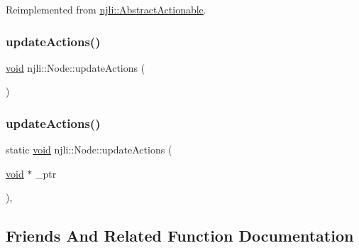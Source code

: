 Reimplemented from \mbox{\hyperlink{classnjli_1_1_abstract_actionable_aab364e6f121a457e33a61850300c2d7b}{njli\+::\+Abstract\+Actionable}}.

\mbox{\label{classnjli_1_1_node_aafd87adc70ed57be9d7f045a1be3412c}} 
\subsubsection{\texorpdfstring{update\+Actions()}{updateActions()}\hspace{0.1cm}{\footnotesize\ttfamily [1/2]}}
{\footnotesize\ttfamily \mbox{\hyperlink{_thread_8h_af1e856da2e658414cb2456cb6f7ebc66}{void}} njli\+::\+Node\+::update\+Actions (\begin{DoxyParamCaption}{ }\end{DoxyParamCaption})\hspace{0.3cm}{\ttfamily [protected]}}

\mbox{\label{classnjli_1_1_node_a4d3f767e870dca336b5daabb1abc00ea}} 
\subsubsection{\texorpdfstring{update\+Actions()}{updateActions()}\hspace{0.1cm}{\footnotesize\ttfamily [2/2]}}
{\footnotesize\ttfamily static \mbox{\hyperlink{_thread_8h_af1e856da2e658414cb2456cb6f7ebc66}{void}} njli\+::\+Node\+::update\+Actions (\begin{DoxyParamCaption}\item[{\mbox{\hyperlink{_thread_8h_af1e856da2e658414cb2456cb6f7ebc66}{void}} $\ast$}]{\+\_\+ptr }\end{DoxyParamCaption})\hspace{0.3cm}{\ttfamily [static]}, {\ttfamily [private]}}



\subsection{Friends And Related Function Documentation}
\mbox{\label{classnjli_1_1_node_a9aca7b7350e6ffa0e2d6320834ad1857}} 
